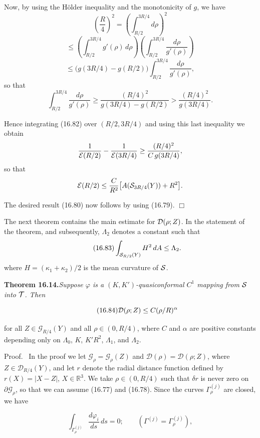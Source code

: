 
Now, by using the H\"older inequality and the monotonicity of $g$, we have
\[
\left(\frac{R}{4}\right)^2
=
\left(\int_{R/2}^{3R/4} d\rho\right)^2
\]
\[
\leq
\left(\int_{R/2}^{3R/4} g'(\rho)\,d\rho\right)
\left(\int_{R/2}^{3R/4} \frac{d\rho}{g'(\rho)}\right)
\]
\[
\leq
\bigl(g(3R/4)-g(R/2)\bigr)
\int_{R/2}^{3R/4}\frac{d\rho}{g'(\rho)},
\]
so that
\[
\int_{R/2}^{3R/4}\frac{d\rho}{g'(\rho)}
\geq
\frac{(R/4)^2}{g(3R/4)-g(R/2)}
>
\frac{(R/4)^2}{g(3R/4)}.
\]

Hence integrating (16.82) over $(R/2,3R/4)$ and using this last inequality we obtain
\[
\frac{1}{\mathcal{E}(R/2)}-\frac{1}{\mathcal{E}(3R/4)}
\geq
\frac{(R/4)^2}{C\,g(3R/4)},
\]
so that
\[
\mathcal{E}(R/2)\leq \frac{C}{R^2}\bigl[A(\mathcal{S}_{3R/4}(Y))+R^2\bigr].
\]

The desired result (16.80) now follows by using (16.79). $\Box$

The next theorem contains the main estimate for $\mathcal{D}(\rho; Z)$. In the statement of the
theorem, and subsequently, $\Lambda_2$ denotes a constant such that
\[
\tag{16.83}
\int_{\mathcal{S}_{R/2}(Y)} H^2\, dA \leq \Lambda_2.
\]
where $H=(\kappa_1+\kappa_2)/2$ is the mean curvature of $\mathcal{S}$.

\medskip

\noindent\textbf{Theorem 16.14.}\quad \textit{Suppose $\varphi$ is a $(K,K')$-quasiconformal $C^1$ mapping from $\mathcal{S}$ into $\mathcal{T}$.
Then}

\begin{equation}\tag{16.84}
\mathcal{D}(\rho; Z)\leq C(\rho/R)^\alpha
\end{equation}


\pagestyle{empty}

for all $Z \in \mathcal G_{R/4}(Y)$ and all $\rho \in (0,R/4)$, where $C$ and $\alpha$ are positive constants depending only on $\Lambda_0$, $K$, $K'R^2$, $\Lambda_1$, and $\Lambda_2$.

\medskip

Proof. \ In the proof we let $\mathcal G_\rho=\mathcal G_\rho(Z)$ and $\mathcal D(\rho)=\mathcal D(\rho;Z)$, where $Z \in \mathcal D_{R/4}(Y)$, and let $r$ denote the radial distance function defined by $r(X)=|X-Z|$, $X \in \mathbb R^3$. We take $\rho \in (0,R/4)$ such that $\delta r$ is never zero on $\partial\mathcal G_\rho$, so that we can assume (16.77) and (16.78). Since the curves $\Gamma_\rho^{(j)}$ are closed, we have

\[
\int_{\Gamma_\rho^{(j)}} \frac{d\varphi_i}{ds}\, ds = 0; \qquad (\Gamma^{(j)}=\Gamma_\rho^{(j)}),
\]

